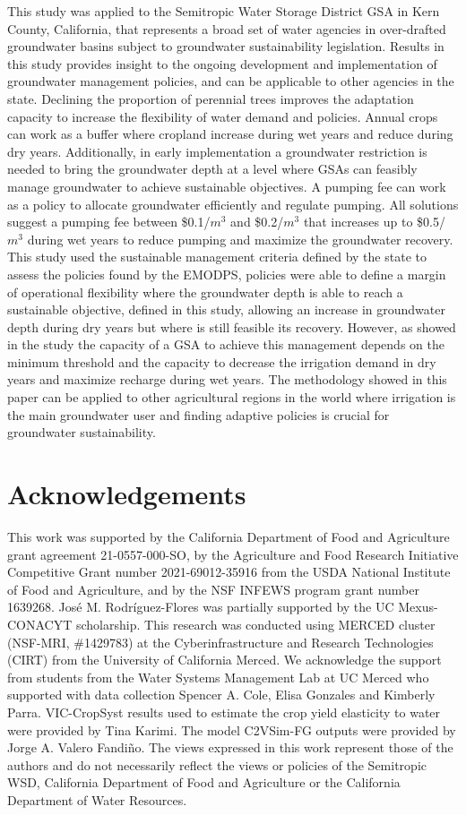 \documentclass[11pt,a4paper]{article}
\begin{document}
This study was applied to the Semitropic Water Storage District GSA in Kern County, California, that represents a broad set of water agencies in over-drafted groundwater basins subject to groundwater sustainability legislation. Results in this study provides insight to the ongoing development and implementation of groundwater management policies, and can be applicable to other agencies in the state. Declining the proportion of perennial trees improves the adaptation capacity to increase the flexibility of water demand and policies. Annual crops can work as a buffer where cropland increase during wet years and reduce during dry years. Additionally, in early implementation a groundwater restriction is needed to bring the groundwater depth at a level where GSAs can feasibly manage groundwater to achieve sustainable objectives. A pumping fee can work as a policy to allocate groundwater efficiently and regulate pumping. All solutions suggest a pumping fee between \$0.1/$m^3$ and \$0.2/$m^3$ that increases up to \$0.5/$m^3$ during wet years to reduce pumping and maximize the groundwater recovery. This study used the sustainable management criteria defined by the state to assess the policies found by the EMODPS, policies were able to define a margin of operational flexibility where the groundwater depth is able to reach a sustainable objective, defined in this study, allowing an increase in groundwater depth during dry years but where is still feasible its recovery. However, as showed in the study the capacity of a GSA to achieve this management depends on the minimum threshold and the capacity to decrease the irrigation demand in dry years and maximize recharge during wet years. The methodology showed in this paper can be applied to other agricultural regions in the world where irrigation is the main groundwater user and finding adaptive policies is crucial for groundwater sustainability.

\section*{Acknowledgements}

This work was supported by the California Department of Food and Agriculture grant agreement 21-0557-000-SO, by the Agriculture and Food Research Initiative Competitive Grant number 2021-69012-35916 from the USDA National Institute of Food and Agriculture, and by the NSF INFEWS program grant number 1639268. José M. Rodríguez-Flores was partially supported by the UC Mexus-CONACYT scholarship. This research was conducted using MERCED cluster (NSF-MRI, \#1429783) at the Cyberinfrastructure and Research Technologies (CIRT) from the University of California Merced. We acknowledge the support from students from the Water Systems Management Lab at UC Merced who supported with data collection Spencer A. Cole, Elisa Gonzales and Kimberly Parra. VIC-CropSyst results used to estimate the crop yield elasticity to water were provided by Tina Karimi. The model C2VSim-FG outputs were provided by Jorge A. Valero Fandiño. The views expressed in this work represent those of the authors and do not necessarily reflect the views or policies of the Semitropic WSD, California Department of Food and Agriculture or the California Department of Water Resources.
\end{document}
